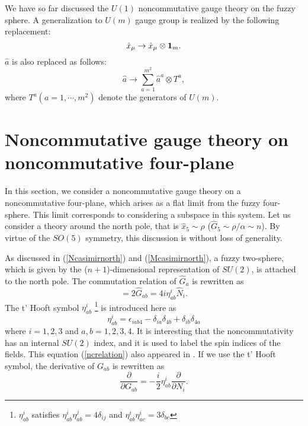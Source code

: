 \documentclass[a4paper,11pt]{article}
\begin{document}
\vspace{0.2cm}

We have so far discussed the $U(1)$ noncommutative gauge theory 
on the fuzzy sphere. 
A generalization to $U(m)$ gauge group is realized 
by the following replacement: 
\begin{equation}
\hat{x}_{\mu} \rightarrow \hat{x}_{\mu}\otimes{\bf 1}_{m}. 
\end{equation}
\noindent 
$\hat{a}$ is also replaced as follows:
\begin{equation}
\hat{a} \rightarrow 
\sum_{a=1}^{m^{2}}\hat{a}^{a}\otimes T^{a}, 
\end{equation}
\noindent 
where $T^{a} (a=1,\cdots, m^{2})$ denote the generators of $U(m)$.






\section{Noncommutative gauge theory on noncommutative four-plane}
\hspace{0.4cm}
In this section, 
we consider a noncommutative gauge theory 
on a noncommutative four-plane, which arises as a flat limit 
from the fuzzy four-sphere. 
This limit corresponds to considering a subspace in this system. 
Let us consider a theory around the north pole, 
that is $\hat{x}_{5}\sim \rho$ 
($\hat{G}_{5}\sim \rho/\alpha \sim n$). 
By virtue of the $SO(5)$ symmetry, this discussion is 
without loss of generality. 

As discussed in (\ref{Ncasimirnorth}) and 
(\ref{Mcasimirnorth}), a fuzzy two-sphere, 
which is given by the ($n+1$)-dimensional representation 
of $SU(2)$, 
is attached 
to the north pole. 
The commutation relation of $\hat{G}_{a}$ 
is rewritten as 
\begin{equation}
[\hat{G}_{a},\hat{G}_{b}]=2\hat{G}_{ab}
=4i\eta_{ab}^{i}\hat{N}_{i}. 
\label{ncrelation}
\end{equation}
The t' Hooft symbol $\eta_{ab}^{i}$
\footnote{
$\eta_{ab}^{i}$ satisfies 
$\eta_{ab}^{i}\eta_{ab}^{j}=4\delta_{ij}$ and 
$\eta_{ab}^{i}\eta_{ac}^{i}=3\delta_{bc}$ 
} 
is introduced here as 
\begin{equation}
\eta_{ab}^{i}=\epsilon_{iab4}-\delta_{ia}\delta_{4b}
+\delta_{ib}\delta_{4a}
\end{equation}
where $i=1,2,3$ and $a,b=1,2,3,4$. 
It is interesting that 
the noncommutativity has an internal $SU(2)$ index, 
and it is used to label the spin indices of the fields. 
This equation (\ref{ncrelation}) also appeared in \cite{zhanghu}. 
If we use the t' Hooft symbol, the derivative of $G_{ab}$ is rewritten as 
\begin{equation}
\frac{\partial}{\partial G_{ab}}=-\frac{i}{2}\eta_{ab}^{i}
\frac{\partial}{\partial N_{i}}.
\end{equation}
\end{document}
